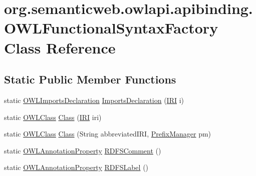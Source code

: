 \hypertarget{classorg_1_1semanticweb_1_1owlapi_1_1apibinding_1_1_o_w_l_functional_syntax_factory}{\section{org.\-semanticweb.\-owlapi.\-apibinding.\-O\-W\-L\-Functional\-Syntax\-Factory Class Reference}
\label{classorg_1_1semanticweb_1_1owlapi_1_1apibinding_1_1_o_w_l_functional_syntax_factory}
}
\subsection*{Static Public Member Functions}
\begin{DoxyCompactItemize}
\item 
static \hyperlink{interfaceorg_1_1semanticweb_1_1owlapi_1_1model_1_1_o_w_l_imports_declaration}{O\-W\-L\-Imports\-Declaration} \hyperlink{classorg_1_1semanticweb_1_1owlapi_1_1apibinding_1_1_o_w_l_functional_syntax_factory_a07c30fc184ca2e6a6651c2415d763904}{Imports\-Declaration} (\hyperlink{classorg_1_1semanticweb_1_1owlapi_1_1model_1_1_i_r_i}{I\-R\-I} i)
\item 
static \hyperlink{interfaceorg_1_1semanticweb_1_1owlapi_1_1model_1_1_o_w_l_class}{O\-W\-L\-Class} \hyperlink{classorg_1_1semanticweb_1_1owlapi_1_1apibinding_1_1_o_w_l_functional_syntax_factory_a1d0ed2ded504e8336550475e53a0c2cf}{Class} (\hyperlink{classorg_1_1semanticweb_1_1owlapi_1_1model_1_1_i_r_i}{I\-R\-I} iri)
\item 
static \hyperlink{interfaceorg_1_1semanticweb_1_1owlapi_1_1model_1_1_o_w_l_class}{O\-W\-L\-Class} \hyperlink{classorg_1_1semanticweb_1_1owlapi_1_1apibinding_1_1_o_w_l_functional_syntax_factory_a3eeebcfbad17a9ef328c51d519d60c44}{Class} (String abbreviated\-I\-R\-I, \hyperlink{interfaceorg_1_1semanticweb_1_1owlapi_1_1model_1_1_prefix_manager}{Prefix\-Manager} pm)
\item 
static \hyperlink{interfaceorg_1_1semanticweb_1_1owlapi_1_1model_1_1_o_w_l_annotation_property}{O\-W\-L\-Annotation\-Property} \hyperlink{classorg_1_1semanticweb_1_1owlapi_1_1apibinding_1_1_o_w_l_functional_syntax_factory_ab1f38b6cbcd415edecc24db61a0cb0bf}{R\-D\-F\-S\-Comment} ()
\item 
static \hyperlink{interfaceorg_1_1semanticweb_1_1owlapi_1_1model_1_1_o_w_l_annotation_property}{O\-W\-L\-Annotation\-Property} \hyperlink{classorg_1_1semanticweb_1_1owlapi_1_1apibinding_1_1_o_w_l_functional_syntax_factory_ae587d16ad07d1aec7779f90f8131dd3e}{R\-D\-F\-S\-Label} ()

\end{DoxyCompactItemize}
